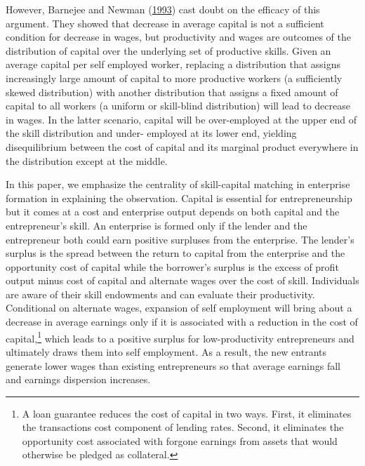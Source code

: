 \documentclass[
  a4paper,
  DIV=11,
  numbers=noendperiod]{scrartcl}
\begin{document}
However, Barnejee and Newman
(\protect\hyperlink{ref-barnejee1993}{1993}) cast doubt on the efficacy
of this argument. They showed that decrease in average capital is not a
sufficient condition for decrease in wages, but productivity and wages
are outcomes of the distribution of capital over the underlying set of
productive skills. Given an average capital per self employed worker,
replacing a distribution that assigns increasingly large amount of
capital to more productive workers (a sufficiently skewed distribution)
with another distribution that assigns a fixed amount of capital to all
workers (a uniform or skill-blind distribution) will lead to decrease in
wages. In the latter scenario, capital will be over-employed at the
upper end of the skill distribution and under- employed at its lower
end, yielding disequilibrium between the cost of capital and its
marginal product everywhere in the distribution except at the middle.

In this paper, we emphasize the centrality of skill-capital matching in
enterprise formation in explaining the observation. Capital is essential
for entrepreneurship but it comes at a cost and enterprise output
depends on both capital and the entrepreneur's skill. An enterprise is
formed only if the lender and the entrepreneur both could earn positive
surpluses from the enterprise. The lender's surplus is the spread
between the return to capital from the enterprise and the opportunity
cost of capital while the borrower's surplus is the excess of profit
output minus cost of capital and alternate wages over the cost of skill.
Individuals are aware of their skill endowments and can evaluate their
productivity. Conditional on alternate wages, expansion of self
employment will bring about a decrease in average earnings only if it is
associated with a reduction in the cost of capital,\footnote{A loan
  guarantee reduces the cost of capital in two ways. First, it
  eliminates the transactions cost component of lending rates. Second,
  it eliminates the opportunity cost associated with forgone earnings
  from assets that would otherwise be pledged as collateral.} which
leads to a positive surplus for low-productivity entrepreneurs and
ultimately draws them into self employment. As a result, the new
entrants generate lower wages than existing entrepreneurs so that
average earnings fall and earnings dispersion increases.
\end{document}
